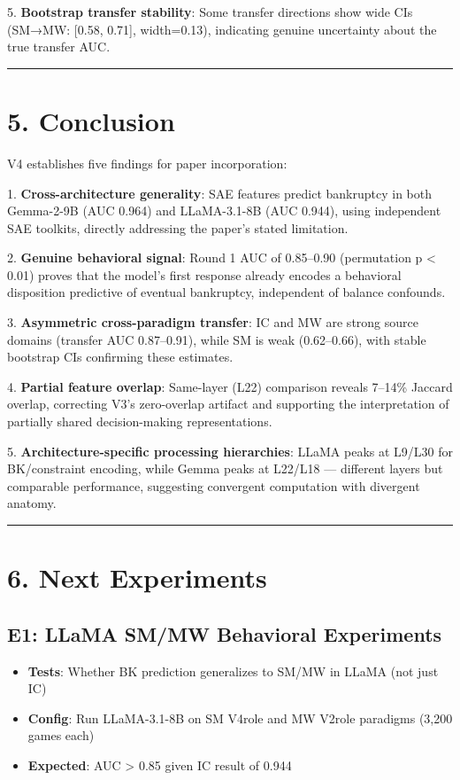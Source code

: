 \documentclass[11pt,a4paper]{article}
\begin{document}
5. \textbf{Bootstrap transfer stability}: Some transfer directions show wide CIs (SM→MW: [0.58, 0.71], width=0.13), indicating genuine uncertainty about the true transfer AUC.

\bigskip\hrule\bigskip

\section{5. Conclusion}

V4 establishes five findings for paper incorporation:

1. \textbf{Cross-architecture generality}: SAE features predict bankruptcy in both Gemma-2-9B (AUC 0.964) and LLaMA-3.1-8B (AUC 0.944), using independent SAE toolkits, directly addressing the paper's stated limitation.

2. \textbf{Genuine behavioral signal}: Round 1 AUC of 0.85–0.90 (permutation p < 0.01) proves that the model's first response already encodes a behavioral disposition predictive of eventual bankruptcy, independent of balance confounds.

3. \textbf{Asymmetric cross-paradigm transfer}: IC and MW are strong source domains (transfer AUC 0.87–0.91), while SM is weak (0.62–0.66), with stable bootstrap CIs confirming these estimates.

4. \textbf{Partial feature overlap}: Same-layer (L22) comparison reveals 7–14\% Jaccard overlap, correcting V3's zero-overlap artifact and supporting the interpretation of partially shared decision-making representations.

5. \textbf{Architecture-specific processing hierarchies}: LLaMA peaks at L9/L30 for BK/constraint encoding, while Gemma peaks at L22/L18 — different layers but comparable performance, suggesting convergent computation with divergent anatomy.

\bigskip\hrule\bigskip

\section{6. Next Experiments}

\subsection{E1: LLaMA SM/MW Behavioral Experiments}
\begin{itemize}
\item \textbf{Tests}: Whether BK prediction generalizes to SM/MW in LLaMA (not just IC)
\end{itemize}
\begin{itemize}
\item \textbf{Config}: Run LLaMA-3.1-8B on SM V4role and MW V2role paradigms (3,200 games each)
\end{itemize}
\begin{itemize}
\item \textbf{Expected}: AUC > 0.85 given IC result of 0.944
\end{itemize}
\end{document}
